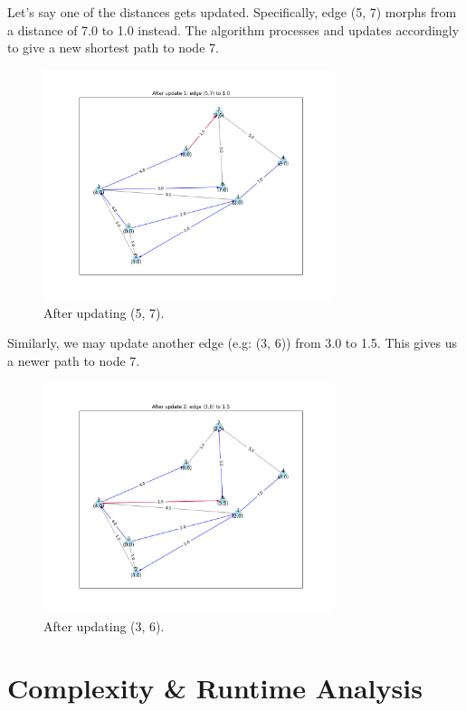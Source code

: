 \documentclass[12pt]{article}
\begin{document}
Let's say one of the distances gets updated. Specifically, edge (5, 7) morphs from a distance of 7.0 to 1.0 instead. The algorithm processes and updates accordingly to give a new shortest path to node 7.

\begin{figure}[h!]
    \centering
    \includegraphics[width=0.75\textwidth]{After_update_1_edge_5,7_to_10.png}
    \caption{After updating (5, 7).} 
    \label{test_2}
\end{figure}

Similarly, we may update another edge (e.g: (3, 6)) from 3.0 to 1.5. This gives us a newer path to node 7.

\begin{figure}[h!]
    \centering
    \includegraphics[width=0.75\textwidth]{After_update_2_edge_3,6_to_15.png}
    \caption{After updating (3, 6).} 
    \label{test_3}
\end{figure}

\section*{Complexity \& Runtime Analysis}
\end{document}
